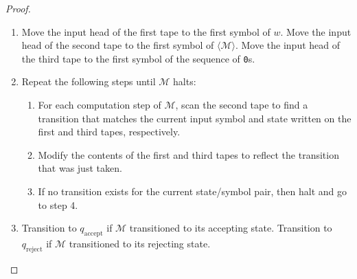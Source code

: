 \begin{theorem}
\begin{proof}
\begin{enumerate}
\begin{center}
\end{center}
\item Move the input head of the first tape to the first symbol of $w$. Move the input head of the second tape to the first symbol of $\langle \mathcal{M} \rangle$. Move the input head of the third tape to the first symbol of the sequence of \texttt{0}s.
\item Repeat the following steps until $\mathcal{M}$ halts:
	\begin{enumerate}
	\item For each computation step of $\mathcal{M}$, scan the second tape to find a transition that matches the current input symbol and state written on the first and third tapes, respectively.
	\item Modify the contents of the first and third tapes to reflect the transition that was just taken.
	\item If no transition exists for the current state/symbol pair, then halt and go to step 4.
	\end{enumerate}
\item Transition to $q_{\text{accept}}$ if $\mathcal{M}$ transitioned to its accepting state. Transition to $q_{\text{reject}}$ if $\mathcal{M}$ transitioned to its rejecting state. \qedhere
\end{enumerate}
\end{proof}
\end{theorem}

